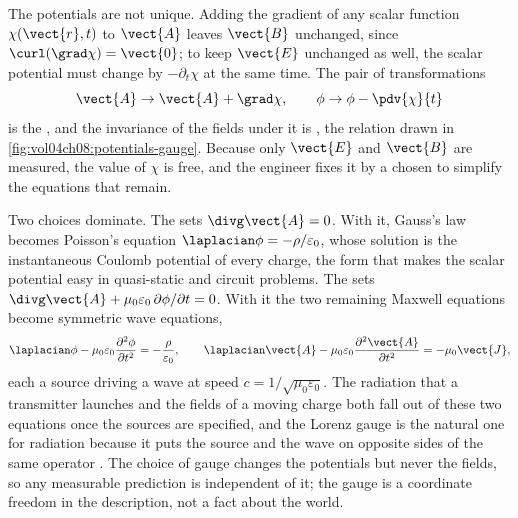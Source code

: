 

The potentials are not unique. Adding the gradient of any scalar function
$\chi(\vect{r}, t)$ to $\vect{A}$ leaves $\vect{B}$ unchanged, since
$\curl(\grad\chi) = \vect{0}$; to keep $\vect{E}$ unchanged as well, the
scalar potential must change by $-\partial_t\chi$ at the same time. The
pair of transformations
\[
\vect{A}\to\vect{A} + \grad\chi, \qquad \phi\to\phi - \pdv{\chi}{t}
\]
is the , and the invariance of the fields
under it is , the relation drawn in
\cref{fig:vol04ch08:potentials-gauge}. Because only $\vect{E}$ and
$\vect{B}$ are measured, the value of $\chi$ is free, and the engineer
fixes it by a  chosen to simplify the equations
that remain.

Two choices dominate. The  sets
$\divg\vect{A} = 0$. With it, Gauss's law becomes Poisson's equation
$\laplacian\phi = -\rho/\varepsilon_0$, whose solution is the
instantaneous Coulomb potential of every charge, the form that makes the
scalar potential easy in quasi-static and circuit problems. The
 sets $\divg\vect{A} + \mu_0\varepsilon_0\,
\partial\phi/\partial t = 0$. With it the two remaining Maxwell equations
become symmetric wave equations,
\[
\laplacian\phi - \mu_0\varepsilon_0\frac{\partial^{2}\phi}{\partial t^{2}}
= -\frac{\rho}{\varepsilon_0}, \qquad
\laplacian\vect{A} - \mu_0\varepsilon_0\frac{\partial^{2}\vect{A}}{
\partial t^{2}} = -\mu_0\vect{J},
\]
each a source driving a wave at speed $c = 1/\sqrt{\mu_0\varepsilon_0}$.
The radiation that a transmitter launches and the fields of a moving
charge both fall out of these two equations once the sources are
specified, and the Lorenz gauge is the natural one for radiation because
it puts the source and the wave on opposite sides of the same operator
\cite[ch.~10]{text:griffiths2017}. The choice of gauge changes the
potentials but never the fields, so any measurable prediction is
independent of it; the gauge is a coordinate freedom in the description,
not a fact about the world.

